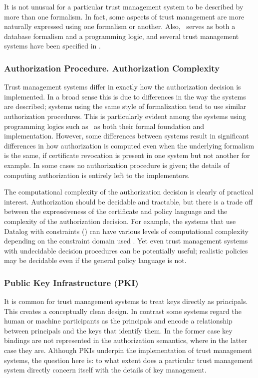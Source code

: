 It is not unusual for a particular trust management system to be
described by more than one formalism. In fact, some aspects of trust
management are more naturally expressed using one formalism or
another.  Also, \datalog\ serves as both a database formalism and a
programming logic, and several trust management systems have been
specified in \datalog.


\subsubsection{Authorization Procedure. Authorization Complexity} Trust
management systems differ in exactly how the authorization decision is
implemented. In a broad sense this is due to differences in the way
the systems are described; systems using the same style of
formalization tend to use similar authorization procedures. This is
particularly evident among the systems using programming logics such
as \datalog\ as both their formal foundation and implementation.
However, some differences between systems result in significant
differences in how authorization is computed even when the underlying
formalism is the same, if certificate revocation is present in one
system but not another for example.  In some cases no authorization
procedure is given; the details of computing authorization is entirely
left to the implementors.

The computational complexity of the authorization decision is clearly of
practical interest. Authorization should be decidable
and tractable, but there is a trade off between the expressiveness of the
certificate and policy language and the complexity of the authorization
decision. For example, the systems that use Datalog with constraints
(\datalogc) can have various levels of computational complexity depending
on the constraint domain used \cite{Li:DCFTML}. Yet even trust management
systems with undecidable decision procedures can be potentially useful;
realistic policies may be decidable even if the general policy language is
not.


\subsubsection{Public Key Infrastructure (PKI)} It is common for trust
management systems to treat keys directly as principals. This creates a
conceptually clean design. In contrast some systems regard the human or
machine participants as the principals and encode a relationship between
principals and the keys that identify them. In the former case key bindings
are not represented in the authorization semantics, where in the latter
case they are. Although PKIs underpin the implementation of trust
management systems, the question here is: to what extent does a particular
trust management system directly concern itself with the details of key
management.

